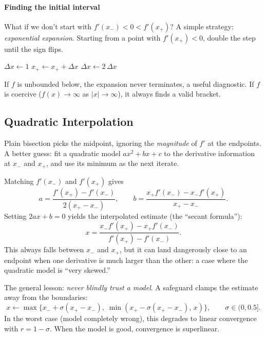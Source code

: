 \paragraph{Finding the initial interval}

What if we don't start with $f'(x_-) < 0 < f'(x_+)$?
A simple strategy: \emph{exponential expansion}.
Starting from a point with $f'(x_+) < 0$, double the step until the sign flips.

\begin{algorithm}
	\caption{Exponential Interval Expansion}
	\begin{algorithmic}[1]
		\State $\Delta x \gets 1$
			\State $x_+ \gets x_+ + \Delta x$
			\State $\Delta x \gets 2\, \Delta x$ 
		\EndWhile
	\end{algorithmic}
\end{algorithm}

If $f$ is unbounded below, the expansion never terminates, a useful diagnostic.
If $f$ is coercive ($f(x) \to \infty$ as $|x| \to \infty$), it always finds a valid bracket.


\subsection{Quadratic Interpolation}\label{sec:quad-interpolation}

Plain bisection picks the midpoint, ignoring the \emph{magnitude} of $f'$ at the endpoints.
A better guess: fit a quadratic model $ax^2 + bx + c$ to the derivative information at $x_-$ and $x_+$, and use its minimum as the next iterate.

Matching $f'(x_-)$ and $f'(x_+)$ gives
\begin{equation}\label{eq:quad-interp-coefficients}
	a = \frac{f'(x_+) - f'(x_-)}{2(x_+ - x_-)},
	\qquad
	b = \frac{x_+ f'(x_-) - x_- f'(x_+)}{x_+ - x_-}.
\end{equation}
Setting $2ax + b = 0$ yields the interpolated estimate (the ``secant formula''):
\begin{equation}\label{eq:secant-formula}
	x = \frac{x_- f'(x_+) - x_+ f'(x_-)}{f'(x_+) - f'(x_-)}.
\end{equation}
This always falls between $x_-$ and $x_+$, but it can land dangerously close to an endpoint when one derivative is much larger than the other: a case where the quadratic model is ``very skewed.''

The general lesson: \emph{never blindly trust a model}.
A safeguard clamps the estimate away from the boundaries:
\begin{equation}\label{eq:safeguard-clamping}
	x \gets \max\bigl\{x_- + \sigma(x_+ - x_-),\; \min(x_+ - \sigma(x_+ - x_-),\, x)\bigr\},
	\qquad \sigma \in (0, 0.5].
\end{equation}
In the worst case (model completely wrong), this degrades to linear convergence with $r = 1 - \sigma$.
When the model is good, convergence is superlinear.


